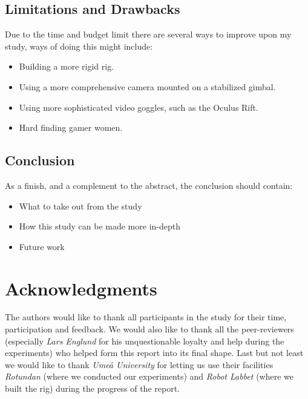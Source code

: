 \documentclass[runningheads,a4paper,oribibl]{llncs}
\begin{document}
\subsection{Limitations and Drawbacks}
Due to the time and budget limit there are several ways to improve upon my study, ways of doing this might include:
\begin{itemize}
	\item Building a more rigid rig.
	\item Using a more comprehensive camera mounted on a stabilized gimbal.
	\item Using more sophisticated video goggles, such as the Oculus Rift.
	\item Hard finding gamer women.
\end{itemize}




\subsection{Conclusion}
As a finish, and a complement to the abstract, the conclusion should contain:
\begin{itemize}
	\item What to take out from the study
	\item How this study can be made more in-depth
	\item Future work
\end{itemize}












\section{Acknowledgments}
The authors would like to thank all participants in the study for their time, participation and feedback. We would also like to thank all the peer-reviewers (especially \emph{Lars Englund} for his unquestionable loyalty and help during the experiments) who helped form this report into its final shape. Last but not least we would like to thank \emph{Umeå University} for letting us use their facilities \emph{Rotundan} (where we conducted our experiments) and \emph{Robot Labbet} (where we built the rig) during the progress of the report.
\end{document}
